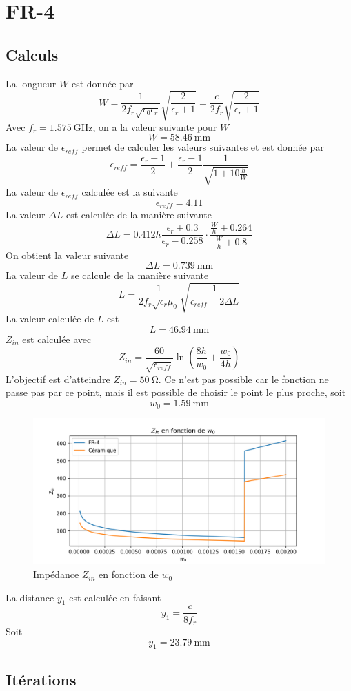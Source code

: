 \documentclass[Deriaz_Traiber_Labo02.tex]{subfiles}
\begin{document}
\section{FR-4}
\subsection{Calculs}
La longueur $W$ est donnée par
$$W=\frac{1}{2f_r\sqrt{\epsilon_0\epsilon_r}}\sqrt{\frac{2}{\epsilon_r+1}}=\frac{c}{2f_r}\sqrt{\frac{2}{\epsilon_r+1}}$$
Avec $f_r=\SI{1.575}{\giga\hertz}$, on a la valeur suivante pour $W$
$$W=\SI{58.46}{\milli\meter}$$
La valeur de $\epsilon_{reff}$ permet de calculer les valeurs suivantes et est donnée par
$$\epsilon_{reff}=\frac{\epsilon_r+1}{2}+\frac{\epsilon_r-1}{2}\frac{1}{\sqrt{1+10\frac{h}{W}}}$$
La valeur de $\epsilon_{reff}$ calculée est la suivante
$$\epsilon_{reff}=4.11$$
La valeur $\Delta L$ est calculée de la manière suivante
$$\Delta L=0.412h\frac{\epsilon_r+0.3}{\epsilon_r-0.258}\cdot\frac{\frac{W}{h}+0.264}{\frac{W}{h}+0.8}$$
On obtient la valeur suivante
$$\Delta L=\SI{0.739}{\milli\meter}$$
La valeur de $L$ se calcule de la manière suivante
$$L=\frac{1}{2f_r\sqrt{\epsilon_r\mu_0}}\sqrt{\frac{1}{\epsilon_{reff}-2\Delta L}}$$
La valeur calculée de $L$ est
$$L=\SI{46.94}{\milli\meter}$$
$Z_{in}$ est calculée avec
$$Z_{in}=\frac{60}{\sqrt{\epsilon_{reff}}}\ln\left(\frac{8h}{w_0}+\frac{w_0}{4h}\right)$$
L'objectif est d'atteindre $Z_{in}=\SI{50}{\ohm}$. Ce n'est pas possible car le fonction ne passe pas par ce point, mais il est possible de choisir le point le plus proche, soit
$$w_0=\SI{1.59}{\milli\meter}$$
\begin{figure}[H]
\centering
\includegraphics[width=12cm]{../Calculs/w0.png}
\caption{Impédance $Z_{in}$ en fonction de $w_0$}
\end{figure}
La distance $y_1$ est calculée en faisant
$$y_1=\frac{c}{8f_r}$$
Soit
$$y_1=\SI{23.79}{\milli\meter}$$
\pagebreak
\subsection{Itérations}
\end{document}

